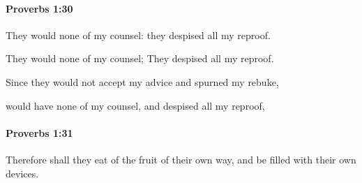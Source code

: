 		\paragraph{Proverbs 1:30} %
			\label{PROVERBS-1-30}

			They would none of my counsel: they despised all my reproof.

			\begin{versebox}
					\item[BHS] 
					\item[ASV] They would none of my counsel; They despised all my reproof.
					\item[NIV] Since they would not accept my advice and spurned my rebuke,
					\item[NRSV] would have none of my counsel, and despised all my reproof,
			\end{versebox}

		\paragraph{Proverbs 1:31} %
			\label{PROVERBS-1-31}

			Therefore shall they eat of the fruit of their own way, and be filled with their own devices.

